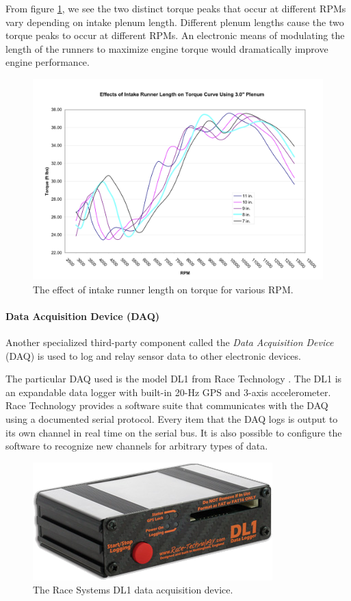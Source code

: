 From figure \ref{fig:irl_effect}, we see the two distinct torque peaks that occur at different RPMs vary depending on intake plenum length. Different plenum lengths cause the two torque peaks to occur at different RPMs. An electronic means of modulating the length of the runners to maximize engine torque would dramatically improve engine performance.

\begin{figure}[H]
	\centering
	 	\includegraphics[scale=0.60]{figures/irl_effect.png}
    \caption{The effect of intake runner length on torque for various RPM.}
    \label{fig:irl_effect}
\end{figure}

\paragraph{Data Acquisition Device (DAQ)}

Another specialized third-party component called the \emph{Data Acquisition Device} (DAQ) is used to log and relay sensor data to other electronic devices.

The particular DAQ used is the model DL1 from Race Technology \cite{DL1Dsheet}. The DL1 is an expandable data logger with built-in 20-Hz GPS and 3-axis accelerometer. Race Technology provides a software suite that communicates with the DAQ using a documented serial protocol. Every item that the DAQ logs is output to its own channel in real time on the serial bus. It is also possible to configure the software to recognize new channels for arbitrary types of data. 

\begin{figure}[H]
	\centering
	 	\includegraphics[scale=0.5]{figures/dl1.png}
    \caption{The Race Systems DL1 data acquisition device.}
    \label{fig:dl1_product}
\end{figure}

